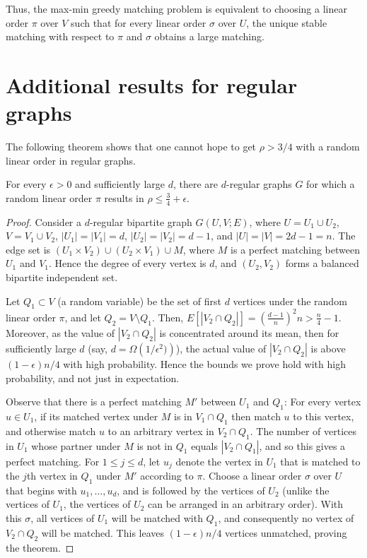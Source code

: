 %
Thus, the max-min greedy matching problem 
%
is equivalent to %
choosing a %
linear order $\pi$ over $V$ such that for every %
linear order $\sigma$ over $U$, the unique stable matching with respect to $\pi$ and $\sigma$ obtains a large matching.

%
%
%
%
%
%
%
%
%
%
%
%
%
%
%
%
%
%
%
%
%
%
%
%
%
%
%
%
%
%
%
%
%
%

%
%

\section{Additional results for regular graphs}
\label{sec:additional}

The following theorem shows that one cannot hope to get $\rho > 3/4$ with a random linear order in regular graphs.


%
\begin{theorem}
	\label{thm:3-4}
	For every $\epsilon > 0$ and sufficiently large $d$, there are $d$-regular graphs $G$ for which a random linear order $\pi$ results in $\rho \le \frac{3}{4} + \epsilon$.
\end{theorem}


\begin{proof}
	Consider a $d$-regular bipartite graph $G(U,V;E)$, where $U = U_1 \cup U_2$, $V = V_1 \cup V_2$,   $|U_1| = |V_1| = d$, $|U_2| = |V_2| = d-1$, and $|U| = |V| = 2d-1 = n$. The edge set is $(U_1 \times V_2) \cup (U_2 \times V_1) \cup M$, where $M$ is a perfect matching between $U_1$ and $V_1$. Hence the degree of every vertex is $d$, and $(U_2,V_2)$ forms 
	a balanced bipartite independent set.
	
	Let $Q_1 \subset V$ (a random variable) be the set of first $d$ vertices under the random linear order $\pi$, and let $Q_2 = V \setminus Q_1$. Then, $E[|V_2 \cap Q_2|] =  (\frac{d-1}{n})^2 n > \frac{n}{4} - 1$. Moreover, as the value of $|V_2 \cap Q_2|$ is concentrated around its mean, then for sufficiently large $d$ (say,
%
$d = \Omega\left(1/\epsilon^2)\right)$),    %
the actual value of $|V_2 \cap Q_2|$ is above 
%
$(1 - \epsilon)n/4$  %
with high probability. Hence the bounds we prove hold with high probability, and not just in expectation.
	
	Observe that there is a perfect matching $M'$ between $U_1$ and $Q_1$: For every vertex $u\in U_1$, if its matched vertex under $M$ is in $V_1 \cap Q_1$ then match $u$ to this vertex, and otherwise match $u$ to an arbitrary vertex in $V_2 \cap Q_1$. The number of vertices in $U_1$ whose partner under $M$ is not in $Q_1$ equals $|V_2 \cap Q_1|$, and so this gives a perfect matching. 
	For $1 \le j \le d$, let $u_j$ denote the vertex in $U_1$ that is matched to the $j$th vertex in $Q_1$ under $M'$ according to $\pi$. 
	Choose a linear order $\sigma$ over $U$ that begins with $u_1, \ldots, u_d$, and is followed by the vertices of $U_2$ (unlike the vertices of $U_1$, the vertices of $U_2$ can be arranged in an arbitrary order). With this $\sigma$, all vertices of $U_1$ will be matched with $Q_1$, and consequently no vertex of $V_2 \cap Q_2$ will be matched. This leaves
%
$(1 - \epsilon)n/4$   %
vertices unmatched, proving the theorem.
\end{proof}


